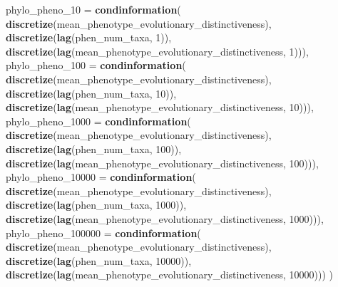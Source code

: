 \documentclass[]{book}
\newenvironment{Shaded}{\begin{snugshade}}{\end{snugshade}}
\newcommand{\DataTypeTok}[1]{\textcolor[rgb]{0.13,0.29,0.53}{#1}}
\newcommand{\DecValTok}[1]{\textcolor[rgb]{0.00,0.00,0.81}{#1}}
\newcommand{\KeywordTok}[1]{\textcolor[rgb]{0.13,0.29,0.53}{\textbf{#1}}}
\newcommand{\NormalTok}[1]{#1}
\begin{document}
\begin{Shaded}
\begin{Highlighting}[]
{  \DataTypeTok{phylo_pheno_10 =}     \KeywordTok{condinformation}\NormalTok{(}
                          \KeywordTok{discretize}\NormalTok{(mean_phenotype_evolutionary_distinctiveness),}
                          \KeywordTok{discretize}\NormalTok{(}\KeywordTok{lag}\NormalTok{(phen_num_taxa, }\DecValTok{1}\NormalTok{)),}
                          \KeywordTok{discretize}\NormalTok{(}\KeywordTok{lag}\NormalTok{(mean_phenotype_evolutionary_distinctiveness, }\DecValTok{1}\NormalTok{))),}
  \DataTypeTok{phylo_pheno_100 =}    \KeywordTok{condinformation}\NormalTok{(}
                          \KeywordTok{discretize}\NormalTok{(mean_phenotype_evolutionary_distinctiveness),}
                          \KeywordTok{discretize}\NormalTok{(}\KeywordTok{lag}\NormalTok{(phen_num_taxa, }\DecValTok{10}\NormalTok{)),}
                          \KeywordTok{discretize}\NormalTok{(}\KeywordTok{lag}\NormalTok{(mean_phenotype_evolutionary_distinctiveness, }\DecValTok{10}\NormalTok{))),}
  \DataTypeTok{phylo_pheno_1000 =}   \KeywordTok{condinformation}\NormalTok{(}
                          \KeywordTok{discretize}\NormalTok{(mean_phenotype_evolutionary_distinctiveness),}
                          \KeywordTok{discretize}\NormalTok{(}\KeywordTok{lag}\NormalTok{(phen_num_taxa, }\DecValTok{100}\NormalTok{)),}
                          \KeywordTok{discretize}\NormalTok{(}\KeywordTok{lag}\NormalTok{(mean_phenotype_evolutionary_distinctiveness, }\DecValTok{100}\NormalTok{))),}
  \DataTypeTok{phylo_pheno_10000 =}  \KeywordTok{condinformation}\NormalTok{(}
                          \KeywordTok{discretize}\NormalTok{(mean_phenotype_evolutionary_distinctiveness),}
                          \KeywordTok{discretize}\NormalTok{(}\KeywordTok{lag}\NormalTok{(phen_num_taxa, }\DecValTok{1000}\NormalTok{)),}
                          \KeywordTok{discretize}\NormalTok{(}\KeywordTok{lag}\NormalTok{(mean_phenotype_evolutionary_distinctiveness, }\DecValTok{1000}\NormalTok{))),}
  \DataTypeTok{phylo_pheno_100000 =} \KeywordTok{condinformation}\NormalTok{(}
                          \KeywordTok{discretize}\NormalTok{(mean_phenotype_evolutionary_distinctiveness),}
                          \KeywordTok{discretize}\NormalTok{(}\KeywordTok{lag}\NormalTok{(phen_num_taxa, }\DecValTok{10000}\NormalTok{)),}
                          \KeywordTok{discretize}\NormalTok{(}\KeywordTok{lag}\NormalTok{(mean_phenotype_evolutionary_distinctiveness, }\DecValTok{10000}\NormalTok{)))}
\NormalTok{)}

}
\end{Highlighting}
\end{Shaded}
\end{document}
